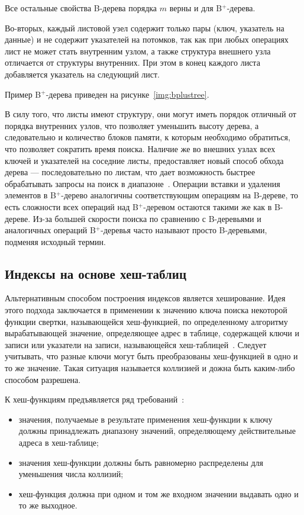 Все остальные свойства B-дерева порядка $m$ верны и для B$^+$-дерева.

Во-вторых, каждый листовой узел содержит только пары (ключ, указатель на данные)
и не содержит указателей на потомков, так как при любых операциях лист не может
стать внутренним узлом, а также структура внешнего узла отличается от структуры
внутренних. При этом в конец каждого листа добавляется указатель на следующий
лист.

Пример B$^+$-дерева приведен на рисунке~\ref{img:bplustree}.


В силу того, что листы имеют структуру, они могут иметь порядок отличный от
порядка внутренних узлов, что позволяет уменьшить высоту дерева, а следовательно
и количество блоков памяти, к которым необходимо обратиться, что позволяет
сократить время поиска. Наличие же во внешних узлах всех ключей и указателей на
соседние листы, предоставляет новый способ обхода дерева --- последовательно по
листам, что дает возможность быстрее обрабатывать запросы на поиск в
диапазоне~\cite{baw}.  Операции вставки и удаления элементов в B$^+$-дерево
аналогичны соответствующим операциям на B-дереве, то есть сложности всех
операций над B$^+$-деревом остаются такими же как в B-дереве. Из-за большей
скорости поиска по сравнению с B-деревьями и аналогичных операций B$^+$-деревья
часто называют просто B-деревьями, подменяя исходный термин.


\subsection{Индексы на основе хеш-таблиц}

Альтернативным способом построения индексов является хеширование. Идея этого
подхода заключается в применении к значению ключа поиска некоторой функции
свертки, называющейся хеш-функцией, по определенному алгоритму вырабатывающей
значение, определяющее адрес в таблице, содержащей ключи и записи или указатели
на записи, называющейся хеш-таблицей~\cite{osip}. Следует учитывать,
что разные ключи могут быть преобразованы хеш-функцией в одно и то же значение.
Такая ситуация называется коллизией и дожна быть каким-либо способом
разрешена.

К хеш-функциям предъявляется ряд требований~\cite{baw, marvel}:
\begin{itemize}
    \item значения, получаемые в результате применения хеш-функции к ключу
        должны принадлежать диапазону значений, определяющему действительные
        адреса в хеш-таблице;
    \item значения хеш-функции должны быть равномерно распределены для
        уменьшения числа коллизий;
    \item хеш-функция должна при одном и том же входном значении выдавать одно
        и то же выходное.
\end{itemize}

